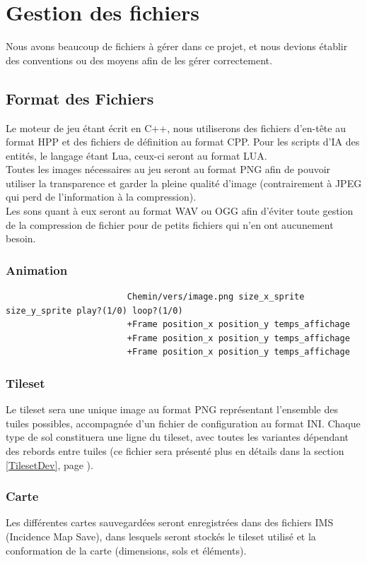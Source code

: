 \documentclass[a4paper]{memoir}
\begin{document}
		\section{Gestion des fichiers}
			Nous avons beaucoup de fichiers à gérer dans ce projet, et nous devions établir des conventions ou des moyens afin de les gérer correctement.
			
			\subsection{Format des Fichiers}
				Le moteur de jeu étant écrit en C++, nous utiliserons des fichiers d'en-tête au format HPP et des fichiers de définition au format CPP. Pour les scripts d'IA des entités, le langage étant Lua, ceux-ci seront au format LUA.\\
				Toutes les images nécessaires au jeu seront au format PNG afin de pouvoir utiliser la transparence et garder la pleine qualité d'image (contrairement à JPEG qui perd de l'information à la compression).\\
				Les sons quant à eux seront au format WAV ou OGG afin d'éviter toute gestion de la compression de fichier pour de petits fichiers qui n'en ont aucunement besoin.

				\subsubsection{Animation}
					\begin{verbatim}
						Chemin/vers/image.png size_x_sprite size_y_sprite play?(1/0) loop?(1/0)
						+Frame position_x position_y temps_affichage
						+Frame position_x position_y temps_affichage
						+Frame position_x position_y temps_affichage
					\end{verbatim}
			
				\subsubsection{Tileset}
					Le tileset sera une unique image au format PNG représentant l'ensemble des tuiles possibles, accompagnée d'un fichier de configuration au format INI. Chaque type de sol constituera une ligne du tileset, avec toutes les variantes dépendant des rebords entre tuiles (ce fichier sera présenté plus en détails dans la section \ref{TilesetDev}, page \pageref{TilesetDev}).

				\subsubsection{Carte}
					Les différentes cartes sauvegardées seront enregistrées dans des fichiers IMS (Incidence Map Save), dans lesquels seront stockés le tileset utilisé et la conformation de la carte (dimensions, sols et éléments).
			
\end{document}

